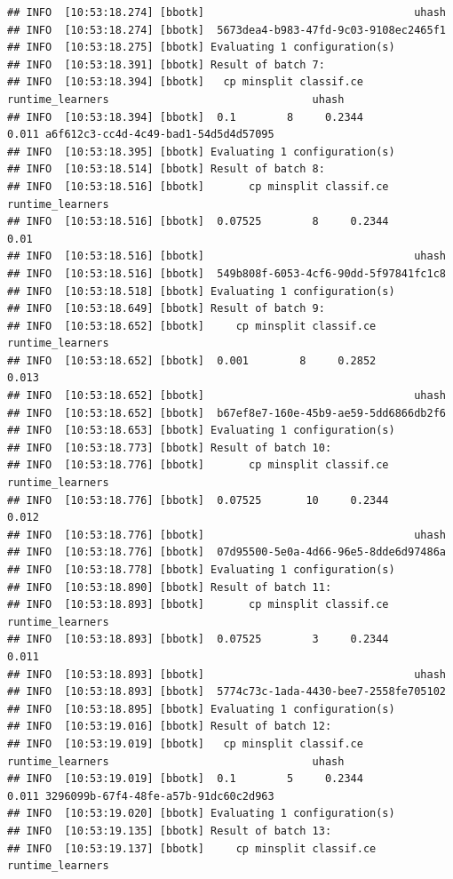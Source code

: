 \documentclass[
]{scrbook}
\begin{document}
\begin{verbatim}
## INFO  [10:53:18.274] [bbotk]                                 uhash 
## INFO  [10:53:18.274] [bbotk]  5673dea4-b983-47fd-9c03-9108ec2465f1 
## INFO  [10:53:18.275] [bbotk] Evaluating 1 configuration(s) 
## INFO  [10:53:18.391] [bbotk] Result of batch 7: 
## INFO  [10:53:18.394] [bbotk]   cp minsplit classif.ce runtime_learners                                uhash 
## INFO  [10:53:18.394] [bbotk]  0.1        8     0.2344            0.011 a6f612c3-cc4d-4c49-bad1-54d5d4d57095 
## INFO  [10:53:18.395] [bbotk] Evaluating 1 configuration(s) 
## INFO  [10:53:18.514] [bbotk] Result of batch 8: 
## INFO  [10:53:18.516] [bbotk]       cp minsplit classif.ce runtime_learners 
## INFO  [10:53:18.516] [bbotk]  0.07525        8     0.2344             0.01 
## INFO  [10:53:18.516] [bbotk]                                 uhash 
## INFO  [10:53:18.516] [bbotk]  549b808f-6053-4cf6-90dd-5f97841fc1c8 
## INFO  [10:53:18.518] [bbotk] Evaluating 1 configuration(s) 
## INFO  [10:53:18.649] [bbotk] Result of batch 9: 
## INFO  [10:53:18.652] [bbotk]     cp minsplit classif.ce runtime_learners 
## INFO  [10:53:18.652] [bbotk]  0.001        8     0.2852            0.013 
## INFO  [10:53:18.652] [bbotk]                                 uhash 
## INFO  [10:53:18.652] [bbotk]  b67ef8e7-160e-45b9-ae59-5dd6866db2f6 
## INFO  [10:53:18.653] [bbotk] Evaluating 1 configuration(s) 
## INFO  [10:53:18.773] [bbotk] Result of batch 10: 
## INFO  [10:53:18.776] [bbotk]       cp minsplit classif.ce runtime_learners 
## INFO  [10:53:18.776] [bbotk]  0.07525       10     0.2344            0.012 
## INFO  [10:53:18.776] [bbotk]                                 uhash 
## INFO  [10:53:18.776] [bbotk]  07d95500-5e0a-4d66-96e5-8dde6d97486a 
## INFO  [10:53:18.778] [bbotk] Evaluating 1 configuration(s) 
## INFO  [10:53:18.890] [bbotk] Result of batch 11: 
## INFO  [10:53:18.893] [bbotk]       cp minsplit classif.ce runtime_learners 
## INFO  [10:53:18.893] [bbotk]  0.07525        3     0.2344            0.011 
## INFO  [10:53:18.893] [bbotk]                                 uhash 
## INFO  [10:53:18.893] [bbotk]  5774c73c-1ada-4430-bee7-2558fe705102 
## INFO  [10:53:18.895] [bbotk] Evaluating 1 configuration(s) 
## INFO  [10:53:19.016] [bbotk] Result of batch 12: 
## INFO  [10:53:19.019] [bbotk]   cp minsplit classif.ce runtime_learners                                uhash 
## INFO  [10:53:19.019] [bbotk]  0.1        5     0.2344            0.011 3296099b-67f4-48fe-a57b-91dc60c2d963 
## INFO  [10:53:19.020] [bbotk] Evaluating 1 configuration(s) 
## INFO  [10:53:19.135] [bbotk] Result of batch 13: 
## INFO  [10:53:19.137] [bbotk]     cp minsplit classif.ce runtime_learners 

\end{verbatim}
\end{document}

